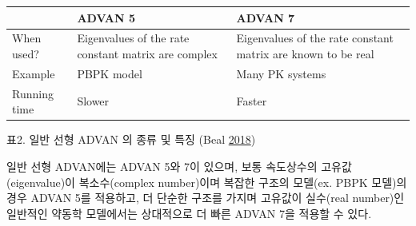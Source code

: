 \documentclass[
  10pt,
]{krantz}
\begin{document}
\begin{longtable}[]{@{}lll@{}}
\toprule
\begin{minipage}[b]{0.09\columnwidth}\raggedright
\strut
\end{minipage} & \begin{minipage}[b]{0.38\columnwidth}\raggedright
ADVAN 5\strut
\end{minipage} & \begin{minipage}[b]{0.45\columnwidth}\raggedright
ADVAN 7\strut
\end{minipage}\tabularnewline
\midrule
\endhead
\begin{minipage}[t]{0.09\columnwidth}\raggedright
When used?\strut
\end{minipage} & \begin{minipage}[t]{0.38\columnwidth}\raggedright
Eigenvalues of the rate constant matrix are complex\strut
\end{minipage} & \begin{minipage}[t]{0.45\columnwidth}\raggedright
Eigenvalues of the rate constant matrix are known to be real\strut
\end{minipage}\tabularnewline
\begin{minipage}[t]{0.09\columnwidth}\raggedright
Example\strut
\end{minipage} & \begin{minipage}[t]{0.38\columnwidth}\raggedright
PBPK model\strut
\end{minipage} & \begin{minipage}[t]{0.45\columnwidth}\raggedright
Many PK systems\strut
\end{minipage}\tabularnewline
\begin{minipage}[t]{0.09\columnwidth}\raggedright
Running time\strut
\end{minipage} & \begin{minipage}[t]{0.38\columnwidth}\raggedright
Slower\strut
\end{minipage} & \begin{minipage}[t]{0.45\columnwidth}\raggedright
Faster\strut
\end{minipage}\tabularnewline
\bottomrule
\end{longtable}

표2. 일반 선형 ADVAN 의 종류 및 특징 (Beal \protect\hyperlink{ref-nonmem}{2018})

일반 선형 ADVAN에는 ADVAN 5와 7이 있으며, 보통 속도상수의 고유값(eigenvalue)이 복소수(complex
number)이며 복잡한 구조의 모델(ex. PBPK 모델)의 경우 ADVAN 5를 적용하고, 더 단순한 구조를 가지며 고유값이
실수(real number)인 일반적인 약동학 모델에서는 상대적으로 더 빠른 ADVAN 7을 적용할 수 있다.
\end{document}
